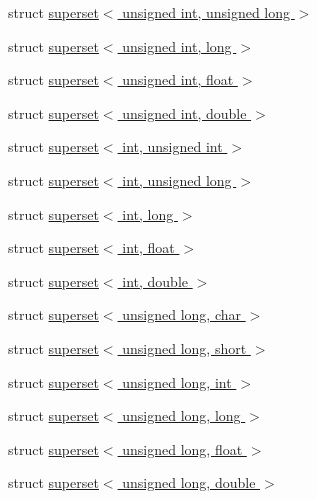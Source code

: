 \begin{DoxyCompactItemize}
\item 
struct \hyperlink{structcimg__library_1_1cimg_1_1superset_3_01unsigned_01int_00_01unsigned_01long_01_4}{superset$<$ unsigned int, unsigned long $>$}
\item 
struct \hyperlink{structcimg__library_1_1cimg_1_1superset_3_01unsigned_01int_00_01long_01_4}{superset$<$ unsigned int, long $>$}
\item 
struct \hyperlink{structcimg__library_1_1cimg_1_1superset_3_01unsigned_01int_00_01float_01_4}{superset$<$ unsigned int, float $>$}
\item 
struct \hyperlink{structcimg__library_1_1cimg_1_1superset_3_01unsigned_01int_00_01double_01_4}{superset$<$ unsigned int, double $>$}
\item 
struct \hyperlink{structcimg__library_1_1cimg_1_1superset_3_01int_00_01unsigned_01int_01_4}{superset$<$ int, unsigned int $>$}
\item 
struct \hyperlink{structcimg__library_1_1cimg_1_1superset_3_01int_00_01unsigned_01long_01_4}{superset$<$ int, unsigned long $>$}
\item 
struct \hyperlink{structcimg__library_1_1cimg_1_1superset_3_01int_00_01long_01_4}{superset$<$ int, long $>$}
\item 
struct \hyperlink{structcimg__library_1_1cimg_1_1superset_3_01int_00_01float_01_4}{superset$<$ int, float $>$}
\item 
struct \hyperlink{structcimg__library_1_1cimg_1_1superset_3_01int_00_01double_01_4}{superset$<$ int, double $>$}
\item 
struct \hyperlink{structcimg__library_1_1cimg_1_1superset_3_01unsigned_01long_00_01char_01_4}{superset$<$ unsigned long, char $>$}
\item 
struct \hyperlink{structcimg__library_1_1cimg_1_1superset_3_01unsigned_01long_00_01short_01_4}{superset$<$ unsigned long, short $>$}
\item 
struct \hyperlink{structcimg__library_1_1cimg_1_1superset_3_01unsigned_01long_00_01int_01_4}{superset$<$ unsigned long, int $>$}
\item 
struct \hyperlink{structcimg__library_1_1cimg_1_1superset_3_01unsigned_01long_00_01long_01_4}{superset$<$ unsigned long, long $>$}
\item 
struct \hyperlink{structcimg__library_1_1cimg_1_1superset_3_01unsigned_01long_00_01float_01_4}{superset$<$ unsigned long, float $>$}
\item 
struct \hyperlink{structcimg__library_1_1cimg_1_1superset_3_01unsigned_01long_00_01double_01_4}{superset$<$ unsigned long, double $>$}

\end{DoxyCompactItemize}
